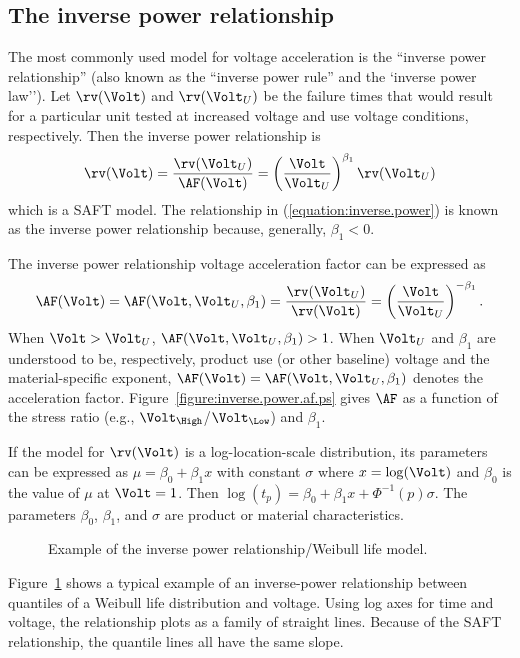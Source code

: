 \subsection{The inverse power relationship}
\label{section:inverse.power.rule}
The most commonly used model for voltage acceleration is the ``inverse
power relationship'' (also known as the ``inverse power rule''
and the `inverse power law''). Let $\rv(\Volt)$ and $\rv(\Volt_{U})$
be the failure times that would result for a particular unit tested at
increased voltage and use voltage conditions, respectively. Then
the inverse power relationship is
\begin{equation}
\label{equation:inverse.power}
\rv(\Volt)=\frac{{\rv}(\Volt_{U})}{\AF(\Volt)}=
	\left (  \frac{  \Volt }{ \Volt_{U} }  
	\right)^{\beta_{1}}\rv(\Volt_{U})
\end{equation}
which is a SAFT model. The relationship in
(\ref{equation:inverse.power}) is known as the inverse power relationship
because, generally, $\beta_{1} < 0$. 

The inverse power relationship voltage acceleration factor can be
expressed as
\begin{equation}
\label{equation:voltage.acceleration}
\AF(\Volt)=\AF(\Volt,\Volt_{U}, \beta_{1})= 
	\frac{{\rv}(\Volt_{U})}{{\rv}(\Volt)}=
	\left (  \frac{  \Volt }{ \Volt_{U}}  \right) ^{-\beta_{1}}.
\end{equation}
When $\Volt > \Volt_{U}$, $\AF(\Volt,\Volt_{U},\beta_{1}) > 1$.  When
$\Volt_{U}$ and $\beta_{1}$ are understood to be, respectively,
product use (or other baseline) voltage and the material-specific
exponent, $\AF(\Volt)=\AF(\Volt,\Volt_{U},\beta_{1})$
denotes the acceleration factor.
Figure~\ref{figure:inverse.power.af.ps} gives $\AF$ as a function of
the stress ratio (e.g.,  $\Volt_{\High}$/$\Volt_{\Low}$) and
$\beta_{1}$.

If the model for $\rv(\Volt)$ is a
log-location-scale distribution, its parameters can be expressed as $\mu =
\beta_{0}+ \beta_{1} x$ with constant $\sigma$ 
where $x=\log(\Volt)$ and $\beta_{0}$ is the value of $\mu$ at
$\Volt=1$.  Then $\log(t_{p}) = \beta_{0}+ \beta_{1} x +
\Phi^{-1}(p) \sigma$.  The parameters $\beta_{0}$, $\beta_{1}$, and
$\sigma$ are product or material characteristics.
\begin{figure}
\caption{Example of the inverse power relationship/Weibull life model.}
\label{figure:inverse.power.altplot.ps}
\end{figure}
Figure~\ref{figure:inverse.power.altplot.ps} shows a typical example
of an inverse-power relationship between quantiles of a Weibull life
distribution and voltage. Using log axes for time and voltage, the
relationship plots as a family of straight lines. Because of the
SAFT relationship, the quantile lines all have the same slope.

